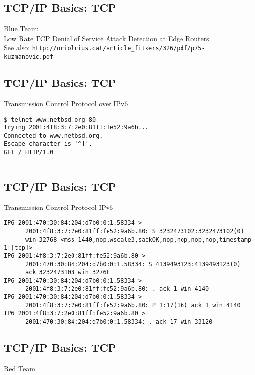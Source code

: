 \documentclass[xga]{xdvislides}
\begin{document}
\subsection{TCP/IP Basics: TCP}
Blue Team: \\

\vspace{.5in}
Low Rate TCP Denial of Service Attack Detection at
Edge Routers \\
\vspace{.5in}
See also:
\verb+http://oriolrius.cat/article_fitxers/326/pdf/p75-kuzmanovic.pdf+

\subsection{TCP/IP Basics: TCP}
\begin{center}
Transmission Control Protocol over IPv6
\end{center}
\vspace{.2in}
\begin{verbatim}
$ telnet www.netbsd.org 80
Trying 2001:4f8:3:7:2e0:81ff:fe52:9a6b...
Connected to www.netbsd.org.
Escape character is '^]'.
GET / HTTP/1.0


\end{verbatim}

\subsection{TCP/IP Basics: TCP}
\begin{center}
Transmission Control Protocol IPv6
\end{center}
\vspace{.2in}
\begin{verbatim}
IP6 2001:470:30:84:204:d7b0:0:1.58334 >
      2001:4f8:3:7:2e0:81ff:fe52:9a6b.80: S 3232473102:3232473102(0)
      win 32768 <mss 1440,nop,wscale3,sackOK,nop,nop,nop,nop,timestamp 1[|tcp]>
IP6 2001:4f8:3:7:2e0:81ff:fe52:9a6b.80 >
      2001:470:30:84:204:d7b0:0:1.58334: S 4139493123:4139493123(0)
      ack 3232473103 win 32768
IP6 2001:470:30:84:204:d7b0:0:1.58334 >
      2001:4f8:3:7:2e0:81ff:fe52:9a6b.80: . ack 1 win 4140
IP6 2001:470:30:84:204:d7b0:0:1.58334 >
      2001:4f8:3:7:2e0:81ff:fe52:9a6b.80: P 1:17(16) ack 1 win 4140
IP6 2001:4f8:3:7:2e0:81ff:fe52:9a6b.80 >
      2001:470:30:84:204:d7b0:0:1.58334: . ack 17 win 33120
\end{verbatim}

\subsection{TCP/IP Basics: TCP}
Red Team: \\
\end{document}
